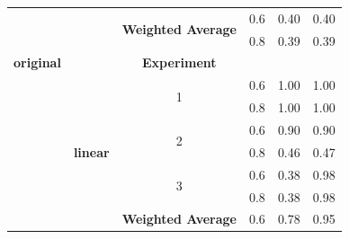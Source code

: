 \documentclass{mpaper}
\begin{document}
\begin{table}[]
\begin{tabular}{|c|c|cccc|}
\textbf{}                       & \textbf{}             & \multicolumn{1}{c|}{\multirow{2}{*}{\textbf{Weighted Average}}} & \multicolumn{1}{c|}{0.6}                & 0.40                              & 0.40                                \\
\textbf{}                       & \textbf{}             & \multicolumn{1}{c|}{}                                           & \multicolumn{1}{c|}{0.8}                & 0.39                              & 0.39                                \\ \cline{2-6} 
\textbf{original}               & \textbf{}             & \multicolumn{1}{c|}{\textbf{Experiment}}                        & \multicolumn{1}{c|}{}                   & \multicolumn{1}{l}{}              & \multicolumn{1}{l|}{}               \\ \cline{3-6} 
                                & \multicolumn{1}{l|}{} & \multicolumn{1}{c|}{\multirow{2}{*}{1}}                         & \multicolumn{1}{c|}{0.6}                & 1.00                              & 1.00                                \\
                                &                       & \multicolumn{1}{c|}{}                                           & \multicolumn{1}{c|}{0.8}                & 1.00                              & 1.00                                \\ \cline{3-6} 
                                &                       & \multicolumn{1}{c|}{\multirow{2}{*}{2}}                         & \multicolumn{1}{c|}{0.6}                & 0.90                              & 0.90                                \\
\multicolumn{1}{|l|}{}          & \textbf{linear}       & \multicolumn{1}{c|}{}                                           & \multicolumn{1}{c|}{0.8}                & 0.46                              & 0.47                                \\ \cline{3-6} 
                                &                       & \multicolumn{1}{c|}{\multirow{2}{*}{3}}                         & \multicolumn{1}{c|}{0.6}                & 0.38                              & 0.98                                \\
                                &                       & \multicolumn{1}{c|}{}                                           & \multicolumn{1}{c|}{0.8}                & 0.38                              & 0.98                                \\ \cline{3-6} 
                                &                       & \multicolumn{1}{c|}{\multirow{2}{*}{\textbf{Weighted Average}}} & \multicolumn{1}{c|}{0.6}                & 0.78                              & 0.95                                \\

\end{tabular}
\end{table}
\end{document}
